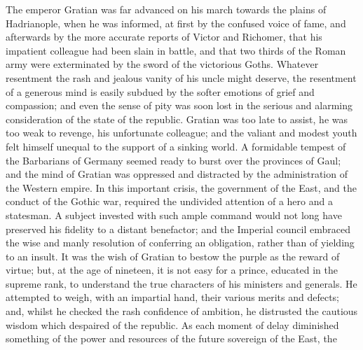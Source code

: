 

The emperor Gratian was far advanced on his march towards the
plains of Hadrianople, when he was informed, at first by the
confused voice of fame, and afterwards by the more accurate
reports of Victor and Richomer, that his impatient colleague had
been slain in battle, and that two thirds of the Roman army were
exterminated by the sword of the victorious Goths. Whatever
resentment the rash and jealous vanity of his uncle might
deserve, the resentment of a generous mind is easily subdued by
the softer emotions of grief and compassion; and even the sense
of pity was soon lost in the serious and alarming consideration
of the state of the republic. Gratian was too late to assist, he
was too weak to revenge, his unfortunate colleague; and the
valiant and modest youth felt himself unequal to the support of a
sinking world. A formidable tempest of the Barbarians of Germany
seemed ready to burst over the provinces of Gaul; and the mind of
Gratian was oppressed and distracted by the administration of the
Western empire. In this important crisis, the government of the
East, and the conduct of the Gothic war, required the undivided
attention of a hero and a statesman. A subject invested with such
ample command would not long have preserved his fidelity to a
distant benefactor; and the Imperial council embraced the wise
and manly resolution of conferring an obligation, rather than of
yielding to an insult. It was the wish of Gratian to bestow the
purple as the reward of virtue; but, at the age of nineteen, it
is not easy for a prince, educated in the supreme rank, to
understand the true characters of his ministers and generals. He
attempted to weigh, with an impartial hand, their various merits
and defects; and, whilst he checked the rash confidence of
ambition, he distrusted the cautious wisdom which despaired of
the republic. As each moment of delay diminished something of the
power and resources of the future sovereign of the East, the
